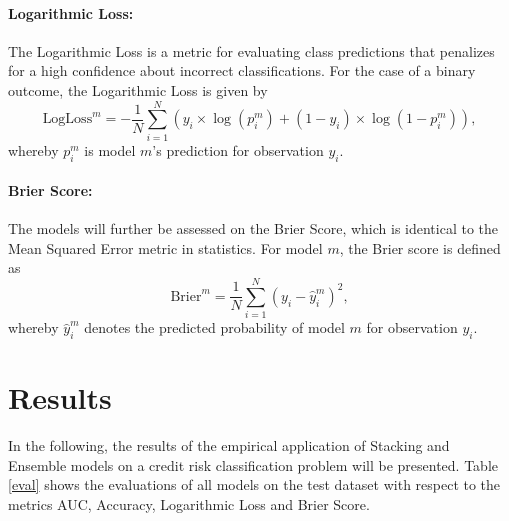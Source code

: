 \documentclass[12pt]{article}
\begin{document}
\paragraph{Logarithmic Loss:} The Logarithmic Loss is a metric for evaluating class predictions that penalizes for a high confidence about incorrect classifications. For the case of a binary outcome, the Logarithmic Loss is given by\\
\begin{equation}
\text{LogLoss}^m = - \frac{1}{N}\sum_{i=1}^{N}(y_i\times\log(p^m_i) + (1 - y_i)\times\log(1 - p^m_i)),
\end{equation}
whereby $p^m_i$ is model $m$'s prediction for observation $y_i$.

\paragraph{Brier Score:} The models will further be assessed on the Brier Score, which is identical to the Mean Squared Error metric in statistics. For model $m$, the Brier score is defined as 
\begin{equation}
\text{Brier}^m = \frac{1}{N}\sum_{i=1}^{N}(y_i - \hat{y}^m_i)^2,
\end{equation}
whereby $\hat{y}^m_i$ denotes the predicted probability of model $m$ for observation $y_i$. 


\section{Results}\label{results}
In the following, the results of the empirical application of Stacking and Ensemble models on a credit risk classification problem will be presented. Table \ref{eval} shows the evaluations of all models on the test dataset with respect to the metrics AUC, Accuracy, Logarithmic Loss and Brier Score. 
\end{document}
